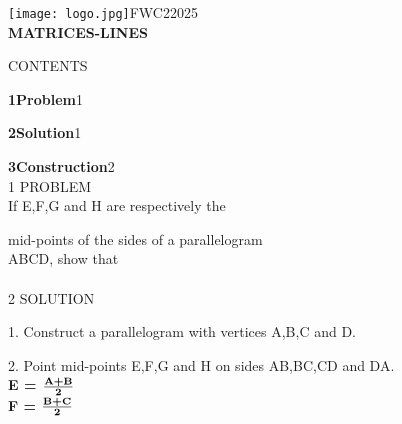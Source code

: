 \documentclass[a4paper,12pt]{report}
\begin{document}
\raggedright{\texttt{[image: logo.jpg]}}\hspace{12.425cm}\raggedleft FWC22025\vspace{2mm}\\
\centering\Large\textbf{MATRICES-LINES}\vspace{5mm}
\begin{multicols}{2}
\centering \large\textsc{C}\footnotesize\textsc{ONTENTS}\vspace{5mm}\\
\raggedright\large\textbf{1\hspace{1cm}Problem}\hspace{5.18cm}1\vspace{5mm}\\
\raggedright\large\textbf{2\hspace{1cm}Solution}\hspace{5.25cm}1\vspace{5mm}\\
\raggedright\large\textbf{3\hspace{1cm}Construction}\hspace{4.27cm}2\vspace{5mm}\\
\centering \large\textsc{1  P}\footnotesize\textsc{ROBLEM}\vspace{5mm}\\
\hspace{1cm}\large{If E,F,G and H are respectively the}\\ \raggedright{mid-points of the sides of a parallelogram \\ ABCD, show that}\\
\vspace{5mm}\\ 
\centering \large\textsc{2  S}\footnotesize\textsc{OLUTION}\vspace{5mm}\\
\raggedright\large{1. Construct a parallelogram with vertices A,B,C and D.}\vspace{2mm}\\
\raggedright\large{2. Point mid-points E,F,G and H on sides AB,BC,CD and DA.}\vspace{5mm}\\
\hspace{2cm}\textbf{E = $\frac{\textbf {A+B}}{\textbf 2}$}\vspace{2mm}\\
\hspace{2cm}\textbf{F = $\frac{\textbf {B+C}}{\textbf 2}$}\vspace{2mm}\\

\end{multicols}
\end{document}

